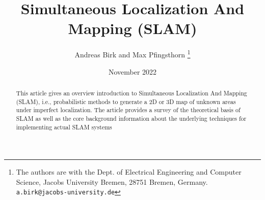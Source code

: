 \documentclass{article}
\title{Simultaneous Localization And Mapping (SLAM)}
\author{Andreas Birk and Max Pfingsthorn
\thanks{The authors are with the Dept. of Electrical Engineering and Computer Science, Jacobs University Bremen, 28751
Bremen, Germany. {\tt\small
a.birk@jacobs-university.de}}}
\date{November 2022}
\begin{document}
\maketitle
\begin{abstract}
This article gives an overview introduction to Simultaneous Localization And Mapping (SLAM), i.e., probabilistic methods to generate a 2D or 3D map of unknown areas under imperfect localization. The article provides a survey of the theoretical basis of SLAM as well as the core background information about the underlying techniques for implementing actual SLAM systems
\end{abstract}
\end{document}
